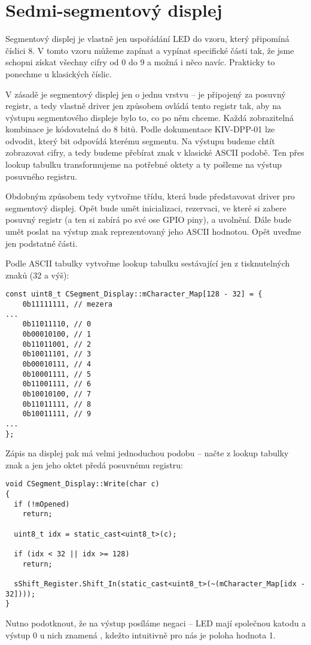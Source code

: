 \documentclass{article}
\begin{document}
\section{Sedmi-segmentový displej}

Segmentový displej je vlastně jen uspořádání LED do vzoru, který připomíná číslici 8. V tomto vzoru můžeme zapínat a vypínat specifické části tak, že jsme schopni získat všechny cifry od 0 do 9 a možná i něco navíc. Prakticky to ponechme u klasických číslic.

V zásadě je segmentový displej jen o jednu vrstvu  -- je připojený za posuvný registr, a tedy vlastně driver jen  způsobem ovládá tento registr tak, aby na výstupu segmentového displeje bylo to, co po něm chceme. Každá zobrazitelná kombinace je kódovatelná do 8 bitů. Podle dokumentace KIV-DPP-01 lze odvodit, který bit odpovídá kterému segmentu. Na výstupu budeme chtít zobrazovat cifry, a tedy budeme přebírat znak v klasické ASCII podobě. Ten přes lookup tabulku transformujeme na potřebné oktety a ty pošleme na výstup posuvného registru.

Obdobným způsobem tedy vytvořme třídu, která bude představovat driver pro segmentový displej. Opět bude umět inicializaci, rezervaci, ve které si zabere posuvný registr (a ten si zabírá po své ose GPIO piny), a uvolnění. Dále bude umět poslat na výstup znak reprezentovaný jeho ASCII hodnotou. Opět uveďme jen podstatné části.

Podle ASCII tabulky vytvořme lookup tabulku sestávající jen z tisknutelných znaků (32 a výš):
\begin{lstlisting}
const uint8_t CSegment_Display::mCharacter_Map[128 - 32] = {
	0b11111111, // mezera
...
	0b11011110, // 0
	0b00010100, // 1
	0b11011001, // 2
	0b10011101, // 3
	0b00010111, // 4
	0b10001111, // 5
	0b11001111, // 6
	0b10010100, // 7
	0b11011111, // 8
	0b10011111, // 9
...
};
\end{lstlisting}
Zápis na displej pak má velmi jednoduchou podobu -- načte z lookup tabulky znak a jen jeho oktet předá posuvnému registru:
\begin{lstlisting}
void CSegment_Display::Write(char c)
{
  if (!mOpened)
    return;

  uint8_t idx = static_cast<uint8_t>(c);
	
  if (idx < 32 || idx >= 128)
    return;

  sShift_Register.Shift_In(static_cast<uint8_t>(~(mCharacter_Map[idx - 32])));
}
\end{lstlisting}
Nutno podotknout, že na výstup posíláme negaci -- LED mají společnou katodu a výstup 0 u nich znamená , kdežto intuitivně pro nás je poloha  hodnota 1.
\end{document}
